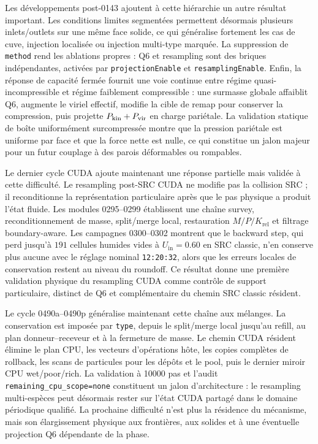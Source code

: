 \documentclass[11pt,a4paper]{article}
\begin{document}
Les développements post-0143 ajoutent à cette hiérarchie un autre résultat important. Les conditions limites segmentées permettent désormais plusieurs inlets/outlets sur une même face solide, ce qui généralise fortement les cas de cuve, injection localisée ou injection multi-type marquée. La suppression de \texttt{method} rend les ablations propres : Q6 et resampling sont des briques indépendantes, activées par \texttt{projectionEnable} et \texttt{resamplingEnable}. Enfin, la réponse de capacité fermée fournit une voie continue entre régime quasi-incompressible et régime faiblement compressible : une surmasse globale affaiblit Q6, augmente le viriel effectif, modifie la cible de remap pour conserver la compression, puis projette \(P_{\rm kin}+P_{\rm vir}\) en charge pariétale. La validation statique de boîte uniformément surcompressée montre que la pression pariétale est uniforme par face et que la force nette est nulle, ce qui constitue un jalon majeur pour un futur couplage à des parois déformables ou rompables.



Le dernier cycle CUDA ajoute maintenant une réponse partielle mais validée à cette difficulté. Le resampling post-SRC CUDA ne modifie pas la collision SRC ; il reconditionne la représentation particulaire après que le pas physique a produit l'état fluide. Les modules 0295--0299 établissent une chaîne survey, reconditionnement de masse, split/merge local, restauration $M/P/K_{\mathrm{rel}}$ et filtrage boundary-aware. Les campagnes 0300--0302 montrent que le backward step, qui perd jusqu'à $191$ cellules humides vides à $U_{\mathrm{in}}=0.60$ en SRC classic, n'en conserve plus aucune avec le réglage nominal \texttt{12:20:32}, alors que les erreurs locales de conservation restent au niveau du roundoff. Ce résultat donne une première validation physique du resampling CUDA comme contrôle de support particulaire, distinct de Q6 et complémentaire du chemin SRC classic résident.


Le cycle 0490a--0490p généralise maintenant cette chaîne aux mélanges. La conservation est imposée par \texttt{type}, depuis le split/merge local jusqu'au refill, au plan donneur--receveur et à la fermeture de masse. Le chemin CUDA résident élimine le plan CPU, les vecteurs d'opérations hôte, les copies complètes de rollback, les scans de particules pour les dépôts et le pool, puis le dernier miroir CPU wet/poor/rich. La validation à 10000 pas et l'audit \texttt{remaining\_cpu\_scope=none} constituent un jalon d'architecture : le resampling multi-espèces peut désormais rester sur l'état CUDA partagé dans le domaine périodique qualifié. La prochaine difficulté n'est plus la résidence du mécanisme, mais son élargissement physique aux frontières, aux solides et à une éventuelle projection Q6 dépendante de la phase.
\end{document}
